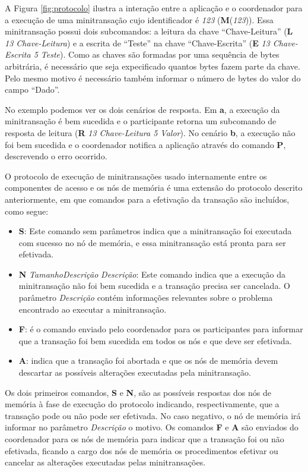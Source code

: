 \documentclass[11pt,twoside,a4paper]{book}
\begin{document}
A Figura \ref{fig:protocolo} ilustra a interação entre a aplicação e o coordenador para a execução de uma minitransação cujo identificador é \textit{123} (\textbf{M}(\textit{123})). Essa minitransação possui dois subcomandos: a leitura da chave ``Chave-Leitura'' (\textbf{L} \textit{13 Chave-Leitura}) e a escrita de ``Teste'' na chave ``Chave-Escrita'' (\textbf{E} \textit{13 Chave-Escrita 5 Teste}). Como as chaves são formadas por uma sequência de bytes arbitrária, é necessário que seja expecificado quantos bytes fazem parte da chave. Pelo mesmo motivo é necessário também informar o número de bytes do valor do campo ``Dado''.

No exemplo podemos ver os dois cenários de resposta. Em \textbf{a}, a execução da minitransação é bem sucedida e o participante retorna um subcomando de resposta de leitura (\textbf{R} \textit{13 Chave-Leitura 5 Valor}). 
No cenário \textbf{b}, a execução não foi bem sucedida e o coordenador notifica a aplicação através do comando \textbf{P}, descrevendo o erro ocorrido.

O protocolo de execução de minitransações usado internamente entre os componentes de acesso e os nós de memória é uma extensão do protocolo descrito anteriormente, em que comandos para a efetivação da transação são incluídos, como segue:

\begin{itemize}
    \item \textbf{S}: Este comando sem parâmetros indica que a minitransação foi executada com sucesso no nó de memória, e essa minitransação está pronta para ser efetivada.

    \item \textbf{N} \textit{TamanhoDescrição} \textit{Descrição}: Este comando indica que a execução da minitransação não foi bem sucedida e a transação precisa ser cancelada. O parâmetro \textit{Descrição} contém informações relevantes sobre o problema encontrado ao executar a minitransação.

    \item \textbf{F}: é o comando enviado pelo coordenador para os participantes para informar que a transação foi bem sucedida em todos os nós e que deve ser efetivada.

    \item \textbf{A}: indica que a transação foi abortada e que os nós de memória devem descartar as possíveis alterações executadas pela minitransação.
\end{itemize}

Os dois primeiros comandos, \textbf{S} e \textbf{N}, são as possíveis respostas dos nós de memória à fase de execução do protocolo indicando, respectivamente, que a transação pode ou não pode ser efetivada. No caso negativo, o nó de memória irá informar no parâmetro \textit{Descrição} o motivo. Os comandos \textbf{F} e \textbf{A} são enviados do coordenador para os nós de memória para indicar que a transação foi ou não efetivada, ficando a cargo dos nós de memória os procedimentos efetivar ou cancelar as alterações executadas pelas minitransações.
\end{document}

